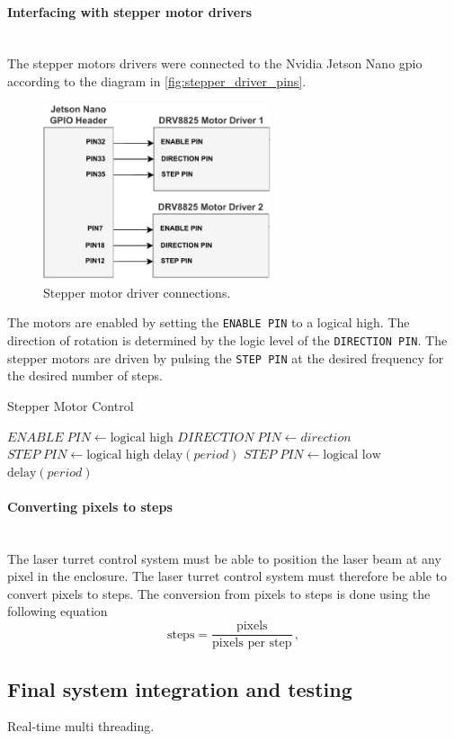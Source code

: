 \paragraph{Interfacing with stepper motor drivers}\mbox{}\\
The stepper motors drivers were connected to the Nvidia Jetson Nano \gls{gpio} according to the diagram in \autoref{fig:stepper_driver_pins}.
\begin{figure}
    \centering
    \includegraphics[width=0.6\textwidth]{figures/stepper_driver_pins.pdf}
    \caption{Stepper motor driver connections.}
    \label{fig:stepper_driver_pins}
\end{figure}
The motors are enabled by setting the \texttt{ENABLE PIN} to a logical high. The direction of rotation is determined by the logic level of the \texttt{DIRECTION PIN}. The stepper motors are driven by pulsing the \texttt{STEP PIN} at the desired frequency for the desired number of steps.
\begin{algorithm}[h]
    \caption{Stepper Motor Control}
    \label{alg:stepper_control}
    \begin{algorithmic}[1]
        \State $ENABLE\;PIN \gets \text{logical high}$
        \State $DIRECTION\;PIN \gets direction$
        \State $STEP\;PIN \gets \text{logical high}$
        \State $\text{delay}(period)$
        \State $STEP\;PIN \gets \text{logical low}$
        \State $\text{delay}(period)$
        \EndFor
    \end{algorithmic}
\end{algorithm}


\paragraph{Converting pixels to steps}\mbox{}\\
The laser turret control system must be able to position the laser beam at any pixel in the enclosure. The laser turret control system must therefore be able to convert pixels to steps. The conversion from pixels to steps is done using the following equation
\begin{equation}
    \label{eq:pixels_to_steps}
    \text{steps} = \frac{\text{pixels}}{\text{pixels per step}}\,,
\end{equation}



\subsection{Final system integration and testing}\label{subsec:integration}
Real-time multi threading.

\newpage


